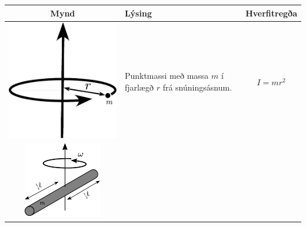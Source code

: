 \ifdefined \wholebook \else\documentclass[oneside]{book}\usepackage{EdlBook}\graphicspath{{figures/}}
\begin{document}
\begin{table}[h!]
  \centering
  \begin{tabular}{ | c | m{5cm} | m{5cm} | }
    \hline
    Mynd & Lýsing & Hverfitregða \\ \hline
    \begin{minipage}{.3\textwidth}
    \vspace{0.3cm}
    \centering
      \includegraphics[width=0.7\linewidth]{momentsOfInertia/PointInertia.pdf}
    \vspace{0.3cm}
    \end{minipage}
    &
      Punktmassi með massa $m$ í fjarlægð $r$ frá snúningsásnum.
    & 
      \begin{align*}
          I = mr^2
      \end{align*}
    \\ \hline
        \begin{minipage}{.3\textwidth}
        \vspace{0.3cm}
    \centering
      \includegraphics[width=0.8\linewidth]{momentsOfInertia/Moment_of_inertia_rod_center.pdf}

\end{minipage}
\end{tabular}
\end{table}
\end{document}
